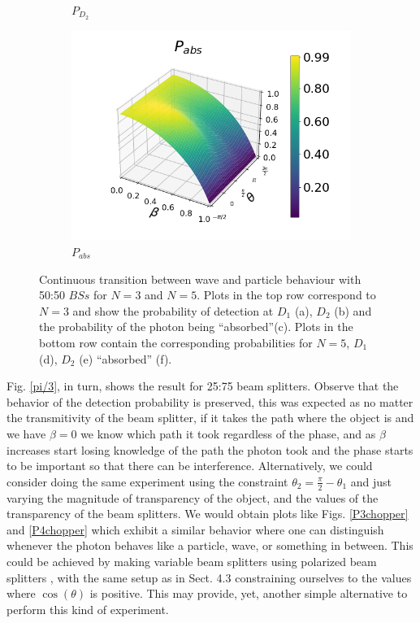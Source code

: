 \documentclass[12pt]{book}
\begin{document}
\begin{figure}[t!]
\begin{subfigure}[b]{0.3\linewidth}
\caption{$P_{D_{2}}$ }
\label{fig:BS1}
\end{subfigure}
\begin{subfigure}[b]{0.3\linewidth}
\includegraphics[width=\linewidth]{images/pabs_5_pi4.png}
\caption{$P_{abs}$ }
\label{fig:BS1}
\end{subfigure}
\caption{Continuous transition between wave and particle behaviour with 50:50 $BSs$ for $N=3$ and $N=5$. Plots in the top row correspond to $N=3$ and show the probability of detection at $D_{1}$ (a), $D_{2}$ (b) and the probability of the photon being ``absorbed''(c). Plots in the bottom row contain the corresponding probabilities for $N=5$,  $D_{1}$ (d),  $D_{2}$ (e)  ``absorbed'' (f).}
\label{varias}
\end{figure}

Fig. \ref{pi/3}, in turn, shows the result for 25:75 beam splitters. Observe that the behavior of the detection probability is preserved, this was expected as no matter the transmitivity of the beam splitter, if it takes the path where the object is and we have $\beta=0$ we know which path it took regardless of the phase, and as $\beta$ increases start losing knowledge of the path the photon took and the phase starts to be important so that there can be interference. Alternatively, we could consider doing the same experiment using the constraint $\theta_{2}=\frac{\pi}{2}-\theta_{1}$ and just varying the magnitude of transparency of the object, and the values of the transparency of the beam splitters. We would obtain plots like Figs. \ref{P3chopper} and \ref{P4chopper} which exhibit a similar behavior where one can distinguish whenever the photon behaves like a particle, wave, or something in between. This could be achieved by making variable beam splitters using polarized beam splitters \cite{variable}, with the same setup as in Sect. 4.3 constraining ourselves to the values where $\cos(\theta)$ is positive. This may provide, yet, another simple alternative to perform this kind of experiment.
\end{document}
